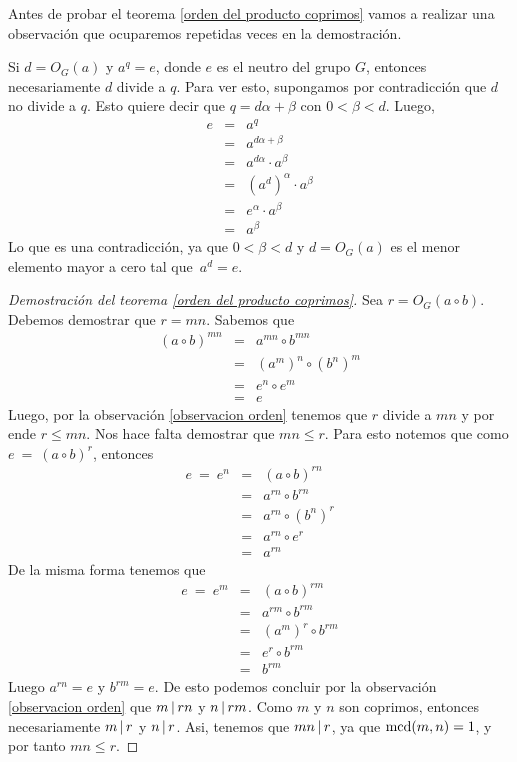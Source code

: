 Antes de probar el teorema \ref{orden del producto coprimos} vamos a realizar una observación que ocuparemos repetidas veces en la demostración.
\begin{observacion}\label{observacion orden}
 Si $d=O_G(a)$ y $a^q =e$, donde $e$ es el neutro del grupo $G$, entonces necesariamente $d$ divide a $q$. Para ver esto, supongamos por contradicción que $d$ no divide a $q$. Esto quiere decir que $q = d\alpha + \beta$ con $0<\beta<d$. Luego, 
\begin{eqnarray*}
	e &=& a^q \\
	 &=&  a^{d\alpha  + \beta} \\ 
	 &=&  a^{d\alpha }\cdot a^{\beta}\\
	 &=&  (a^{d})^{\alpha }\cdot a^{\beta}\\
	 &=&  e^{\alpha}\cdot a^{\beta}\\
	 &=&  a^{\beta} 
\end{eqnarray*} 
Lo que es una contradicción, ya que $0<\beta < d$ y $d = O_G(a)$ es el menor elemento mayor a cero tal que~$a^d = e$.   
\end{observacion}
\begin{proof}[Demostración del teorema \ref{orden del producto coprimos}]
	Sea $r=O_G(a\circ b)$. Debemos demostrar que $r = mn$. Sabemos que 
	\begin{eqnarray*}
		(a\circ b)^{mn} &=& a^{mn}\circ b^{mn}\\
                &=& (a^m)^n\circ (b^n)^m\\
		&=&e^n\circ e^m \\
		 &=&  e
	\end{eqnarray*}
Luego, por la observación \ref{observacion orden} tenemos que $r$ divide a $mn$ y por ende $r\leq mn$. Nos hace falta demostrar que $mn\leq r$. Para esto notemos que como $e \ = \ (a\circ b)^r$, entonces
\begin{eqnarray*}
	 e \ = \ e^n & =&  (a\circ b)^{rn} \\
	 & = & a^{rn} \circ b^{rn}\\
	 & = & a^{rn} \circ (b^{n})^{r}\\
	 & = & a^{rn} \circ e^{r}\\
	 &=& a^{rn}
\end{eqnarray*}
 De la misma forma tenemos que
\begin{eqnarray*}
	 e \ = \ e^m & =&  (a\circ b)^{rm} \\
	 & = & a^{rm} \circ b^{rm}\\
	 & = & (a^{m})^r \circ b^{rm}\\
	 & = & e^{r} \circ b^{rm}\\
	 &=& b^{rm}
\end{eqnarray*}
Luego $a^{rn}=e$ y $b^{rm} = e$. De esto podemos concluir por la observación \ref{observacion orden} que $m \hspace{1.8pt}|\hspace{1.8pt} rn$ y $n\hspace{1.8pt}|\hspace{1.8pt} rm$. Como $m$ y $n$ son coprimos, entonces necesariamente $m \hspace{1.8pt}|\hspace{1.8pt} r$ y $n\hspace{1.8pt}|\hspace{1.8pt} r$. Asi, tenemos que $mn\hspace{1.8pt}|\hspace{1.8pt} r$, ya que ${\rm mcd}(m,n)=1$, y por tanto $mn\leq r$. 
\end{proof}

